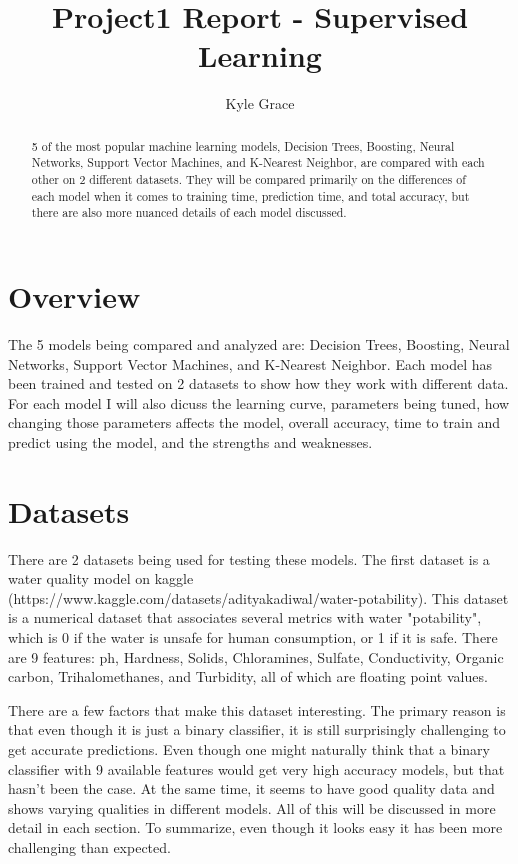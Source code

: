 \documentclass[
	letterpaper, %
]{mlreport}
\author{Kyle Grace}
\title{Project1 Report - Supervised Learning}
\begin{document}

\maketitle

\begin{abstract}
5 of the most popular machine learning models, Decision Trees, Boosting, Neural Networks, Support Vector Machines, and K-Nearest Neighbor, are compared with each other on 2 different datasets. They will be compared primarily on the differences of each model when it comes to training time, prediction time, and total accuracy, but there are also more nuanced details of each model discussed.
\end{abstract}

\section{Overview}
The 5 models being compared and analyzed are: Decision Trees, Boosting, Neural Networks, Support Vector Machines, and K-Nearest Neighbor. Each model has been trained and tested on 2 datasets to show how they work with different data. For each model I will also dicuss the learning curve, parameters being tuned, how changing those parameters affects the model, overall accuracy, time to train and predict using the model, and the strengths and weaknesses.

\section{Datasets}
There are 2 datasets being used for testing these models. The first dataset is a water quality model on kaggle (https://www.kaggle.com/datasets/adityakadiwal/water-potability). This dataset is a numerical dataset that associates several metrics with water "potability", which is 0 if the water is unsafe for human consumption, or 1 if it is safe. There are 9 features: ph, Hardness, Solids, Chloramines, Sulfate, Conductivity, Organic carbon, Trihalomethanes, and Turbidity, all of which are floating point values.

There are a few factors that make this dataset interesting. The primary reason is that even though it is just a binary classifier, it is still surprisingly challenging to get accurate predictions. Even though one might naturally think that a binary classifier with 9 available features would get very high accuracy models, but that hasn't been the case. At the same time, it seems to have good quality data and shows varying qualities in different models. All of this will be discussed in more detail in each section. To summarize, even though it looks easy it has been more challenging than expected.
\end{document}
